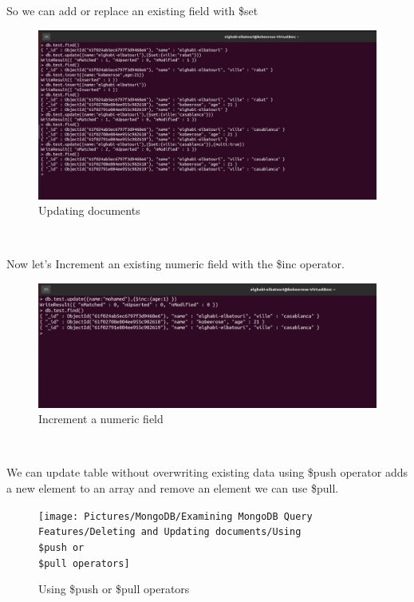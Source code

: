 \begin{spacing}{0.9}
So we can add or replace an existing field with \$set
\\
\begin{figure}[!htb] 
\begin{center} 
\includegraphics[width=1\linewidth]{Pictures/MongoDB/Examining MongoDB Query Features/Deleting and Updating documents/Updating documents} 
\end{center} 
\caption{Updating documents} 
\end{figure}  \FloatBarrier
\\

\par Now let's Increment an existing numeric field with the \$inc operator.
\\
\begin{figure}[!htb] 
\begin{center} 
\includegraphics[width=1\linewidth]{Pictures/MongoDB/Examining MongoDB Query Features/Deleting and Updating documents/Increment a numeric field} 
\end{center} 
\caption{Increment a numeric field} 
\end{figure}  \FloatBarrier
\\
\newpage
\par We can update table without overwriting existing data
using \$push operator adds a new element to an array and remove an element we can use \$pull.
\\
\begin{figure}[!htb] 
\begin{center} 
\texttt{[image: Pictures/MongoDB/Examining MongoDB Query Features/Deleting and Updating documents/Using \\\$push or \\\$pull operators]} 
\end{center} 
\caption{Using \$push or \$pull operators} 
\end{figure}  \FloatBarrier

\end{spacing}